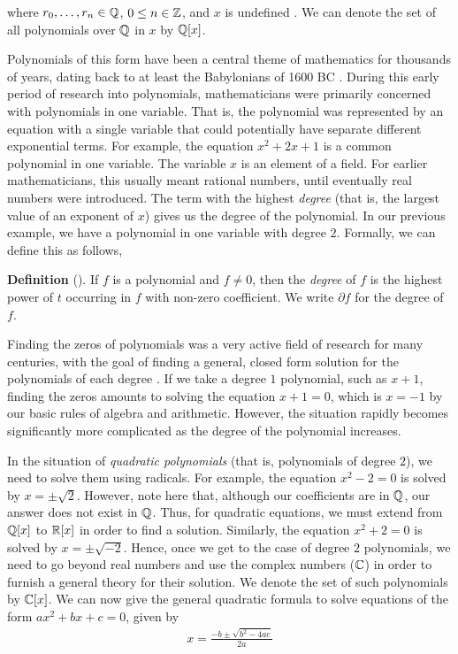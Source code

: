 \documentclass[11pt, a4paper, oneside]{article}
\theoremstyle{plain}
\theoremstyle{plain}
\theoremstyle{plain}
\theoremstyle{plain}
\theoremstyle{definition}
\theoremstyle{example}
\begin{document}
where $r_0, \ldots, r_n \in \mathbb{Q}$, $0 \leq n \in \mathbb{Z}$, and $x$ is undefined \cite[\S 2.1, p. 36]{stewart}. We can denote the set of all polynomials over $\mathbb{Q}$ in $x$ by $\mathbb{Q}[x]$.

\par
Polynomials of this form have been a central theme of mathematics for thousands of years, dating back to at least the Babylonians of 1600 BC \cite[p. 2]{stewart}. During this early period of research into polynomials, mathematicians were primarily concerned with polynomials in one variable. That is, the polynomial was represented by an equation with a single variable that could potentially have separate different exponential terms. For example, the equation $x^2 + 2x + 1$ is a common polynomial in one variable. The variable $x$ is an element of a field. For earlier mathematicians, this usually meant rational numbers, until eventually real numbers were introduced. The term with the highest \textit{degree} (that is, the largest value of an exponent of $x$) gives us the degree of the polynomial. In our previous example, we have a polynomial in one variable with degree $2$. Formally, we can define this as follows,

\par
\textbf{Definition} (\cite[Definition 2.1]{stewart}). If $f$ is a polynomial and $f \neq 0$, then the \textit{degree} of $f$ is the highest power of $t$ occurring in $f$ with non-zero coefficient. We write $\partial f$ for the degree of $f$.

\par
Finding the zeros of polynomials was a very active field of research for many centuries, with the goal of finding a general, closed form solution for the polynomials of each degree \cite[p. 3-5]{stewart}. If we take a degree $1$ polynomial, such as $x + 1$, finding the zeros amounts to solving the equation $x + 1 = 0$, which is $x = -1$ by our basic rules of algebra and arithmetic. However, the situation rapidly becomes significantly more complicated as the degree of the polynomial increases.

\par
In the situation of \textit{quadratic polynomials} (that is, polynomials of degree $2$), we need to solve them using radicals. For example, the equation $x^2 - 2 = 0$ is solved by $x = \pm \sqrt{2}$. However, note here that, although our coefficients are in $\mathbb{Q}$, our answer does not exist in $\mathbb{Q}$. Thus, for quadratic equations, we must extend from $\mathbb{Q}[x]$ to $\mathbb{R}[x]$ in order to find a solution. Similarly, the equation $x^2 + 2 = 0$ is solved by $x = \pm \sqrt{-2}$. Hence, once we get to the case of degree $2$ polynomials, we need to go beyond real numbers and use the complex numbers ($\mathbb{C}$) in order to furnish a general theory for their solution. We denote the set of such polynomials by $\mathbb{C}[x]$. We can now give the general quadratic formula to solve equations of the form $ax^2 + bx + c = 0$, given by
\begin{align*}
x = \frac{-b \pm \sqrt{b^2 - 4ac}}{2a}
\end{align*}
\end{document}
